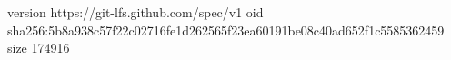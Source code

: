 version https://git-lfs.github.com/spec/v1
oid sha256:5b8a938c57f22c02716fe1d262565f23ea60191be08c40ad652f1c5585362459
size 174916

